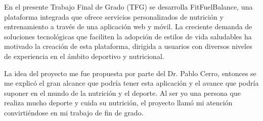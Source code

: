 En el presente Trabajo Final de Grado (TFG) se desarrolla FitFuelBalance, una plataforma integrada que ofrece servicios personalizados de nutrición y entrenamiento a través de una aplicación web y móvil. La creciente demanda de soluciones tecnológicas que faciliten la adopción de estilos de vida saludables ha motivado la creación de esta plataforma, dirigida a usuarios con diversos niveles de experiencia en el ámbito deportivo y nutricional.

La idea del proyecto me fue propuesta por parte del Dr. Pablo Cerro, entonces se me explicó el gran alcance que podría tener esta aplicación y el avance que podría suponer en el mundo de la nutrición y el deporte. Al ser yo una persona que realiza mucho deporte y cuida su nutrición, el proyecto llamó mi atención convirtiéndose en mi trabajo de fin de grado.